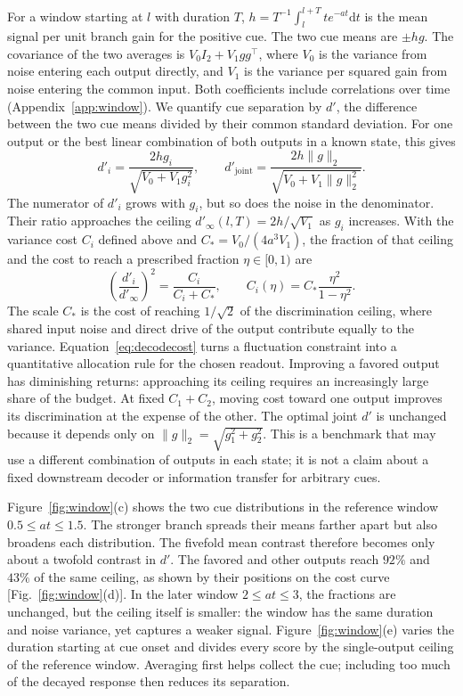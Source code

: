 \documentclass[aps,10pt,onecolumn,superscriptaddress,nofootinbib,longbibliography,
  amsmath,amssymb,floatfix]{revtex4-2}
\newcommand{\dd}{\mathrm{d}}
\begin{document}
For a window starting at \(l\) with duration \(T\),
\(h=T^{-1}\int_l^{l+T}t e^{-at}\dd t\) is the mean signal per unit
branch gain for the positive cue. The two cue means are \(\pm hg\).
The covariance of the two averages is \(V_0 I_2+V_1 gg^\top\),
where \(V_0\) is the variance from noise entering each output
directly, and \(V_1\) is the variance per squared gain from noise
entering the common input. Both coefficients include correlations
over time (Appendix~\ref{app:window}). We quantify cue separation
by \(d'\), the difference between the two cue means divided by
their common standard deviation. For one output or the best linear
combination of both outputs in a known state, this gives
\begin{equation}
  d'_i=\frac{2hg_i}{\sqrt{V_0+V_1g_i^2}},\qquad
  d'_{\mathrm{joint}}=
  \frac{2h\|g\|_2}{\sqrt{V_0+V_1\|g\|_2^2}}.
  \label{eq:decode}
\end{equation}
The numerator of \(d'_i\) grows with \(g_i\), but so does the noise
in the denominator. Their ratio approaches the ceiling
\(d'_\infty(l,T)=2h/\sqrt{V_1}\) as \(g_i\) increases. With the
variance cost \(C_i\) defined above and
\(C_*=V_0/(4a^3V_1)\), the fraction of that ceiling and the cost
to reach a prescribed fraction \(\eta\in[0,1)\) are
\begin{equation}
 \left(\frac{d'_i}{d'_\infty}\right)^2=\frac{C_i}{C_i+C_*},
 \qquad C_i(\eta)=C_*\frac{\eta^2}{1-\eta^2}.
 \label{eq:decodecost}
\end{equation}
The scale \(C_*\) is the cost of reaching \(1/\sqrt{2}\) of the
discrimination ceiling, where shared input noise and direct drive
of the output contribute equally to the variance.
Equation~\eqref{eq:decodecost} turns a fluctuation constraint into
a quantitative allocation rule for the chosen readout. Improving
a favored output has diminishing returns: approaching its ceiling
requires an increasingly large share of the budget. At fixed
\(C_1+C_2\), moving cost toward one output improves its
discrimination at the expense of the other.
The optimal joint \(d'\) is unchanged because it depends only on
\(\|g\|_2=\sqrt{g_1^2+g_2^2}\). This is a benchmark that may use
a different combination of outputs in each state; it is not a
claim about a fixed downstream decoder or information transfer
for arbitrary cues.

Figure~\ref{fig:window}(c) shows the two cue distributions in the
reference window \(0.5\le at\le1.5\). The stronger branch spreads
their means farther apart but also broadens each distribution.
The fivefold mean contrast therefore becomes only about a
twofold contrast in \(d'\). The favored and other outputs
reach \(92\%\) and \(43\%\) of the same ceiling, as shown by
their positions on the cost curve [Fig.~\ref{fig:window}(d)].
In the later window
\(2\le at\le3\), the fractions are unchanged, but the ceiling itself
is smaller: the window has the same duration and noise variance,
yet captures a weaker signal. Figure~\ref{fig:window}(e) varies the
duration starting at cue onset and divides every score by the
single-output ceiling of the reference window. Averaging first
helps collect the cue; including too much of the decayed response
then reduces its separation.
\end{document}
